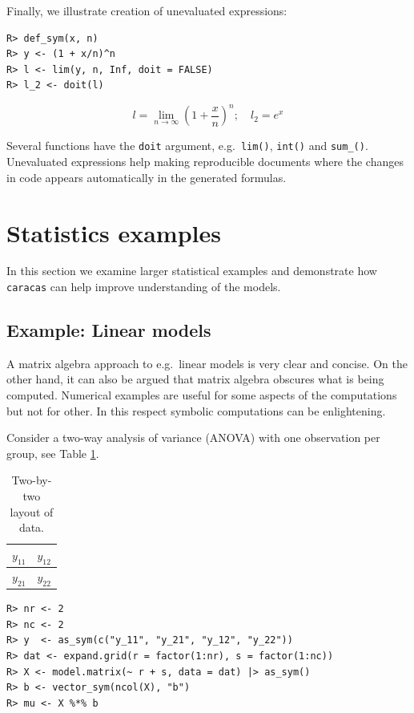Finally, we illustrate creation of unevaluated expressions:

\begin{verbatim}
R> def_sym(x, n)
R> y <- (1 + x/n)^n
R> l <- lim(y, n, Inf, doit = FALSE)
R> l_2 <- doit(l)
\end{verbatim}

\[
l = \lim_{n \to \infty} \left(1 + \frac{x}{n}\right)^{n}; \quad l_2 = e^{x}
\]

Several functions have the \texttt{doit} argument, e.g.~\texttt{lim()}, \texttt{int()} and \texttt{sum\_()}.
Unevaluated expressions help making reproducible documents where the changes
in code appears automatically in the generated formulas.

\hypertarget{statistics-examples}{%
\section{Statistics examples}\label{statistics-examples}}

In this section we examine larger statistical examples and
demonstrate how \texttt{caracas} can help improve understanding of the models.

\hypertarget{example-linear-models}{%
\subsection{Example: Linear models}\label{example-linear-models}}

A matrix algebra approach to e.g.~linear models is very clear and
concise. On the other hand, it can also be argued that matrix algebra
obscures what is being computed. Numerical examples are useful for
some aspects of the computations but not for other. In this respect
symbolic computations can be enlightening.

Consider a two-way analysis of variance (ANOVA) with one observation
per group, see Table \ref{tab:anova-two-way-table}.

\begin{table}[!h]

\caption{\label{tab:anova-two-way-table}Two-by-two layout of data.}
\centering
\begin{tabular}[t]{|>{}l|>{}l|}
\hline
$y_{11}$ & $y_{12}$\\
\hline
$y_{21}$ & $y_{22}$\\
\hline
\end{tabular}
\end{table}

\begin{verbatim}
R> nr <- 2
R> nc <- 2
R> y  <- as_sym(c("y_11", "y_21", "y_12", "y_22"))
R> dat <- expand.grid(r = factor(1:nr), s = factor(1:nc))
R> X <- model.matrix(~ r + s, data = dat) |> as_sym()
R> b <- vector_sym(ncol(X), "b")
R> mu <- X %*% b
\end{verbatim}

